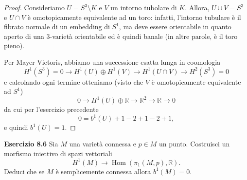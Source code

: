 \documentclass[a4paper]{article}
\newcommand{\R}{\mathbb{R}}
\newcommand{\Hom}{\operatorname{Hom}}
\theoremstyle{definition}
\theoremstyle{definition}
\theoremstyle{remark}
\theoremstyle{definition}
\begin{document}
\begin{proof}
    Consideriamo $U=S^3\setminus K$ e $V$ un intorno tubolare di $K$. Allora, $U\cup V=S^3$ e $U\cap V$ è omotopicamente equivalente ad un toro: infatti,
    l'intorno tubulare è il fibrato normale di un embedding di $S^1$, ma deve essere orientabile in quanto aperto di una 3-varietà orientabile ed è quindi banale (in altre parole, è il toro pieno).

    Per Mayer-Vietoris, abbiamo una successione esatta lunga in coomologia
    \[
        H^1(S^3)=0 \to H^1(U) \oplus H^1(V) \to H^1(U \cap V) \to H^2(S^3) = 0
    \]
    e calcolando ogni termine otteniamo (visto che $V$ è omotopicamente equivalente ad $S^1$)
    \[
        0 \to H^1(U) \oplus \R \to \R^2 \to \R \to 0
    \]
    da cui per l'esercizio precedente
    \[
        0=b^1(U)+1-2+1-2+1,
    \]
    e quindi $b^1(U)=1$.
\end{proof}
\textbf{Esercizio 8.6}
Sia $M$ una varietà connessa e $p \in M$ un punto. Costruisci un morfismo iniettivo di spazi vettoriali
\[
    H^1(M) \to \Hom(\pi_1(M, p), \R).
\]
Deduci che se $M$ è semplicemente connessa allora $b^1(M) = 0$.
\end{document}
